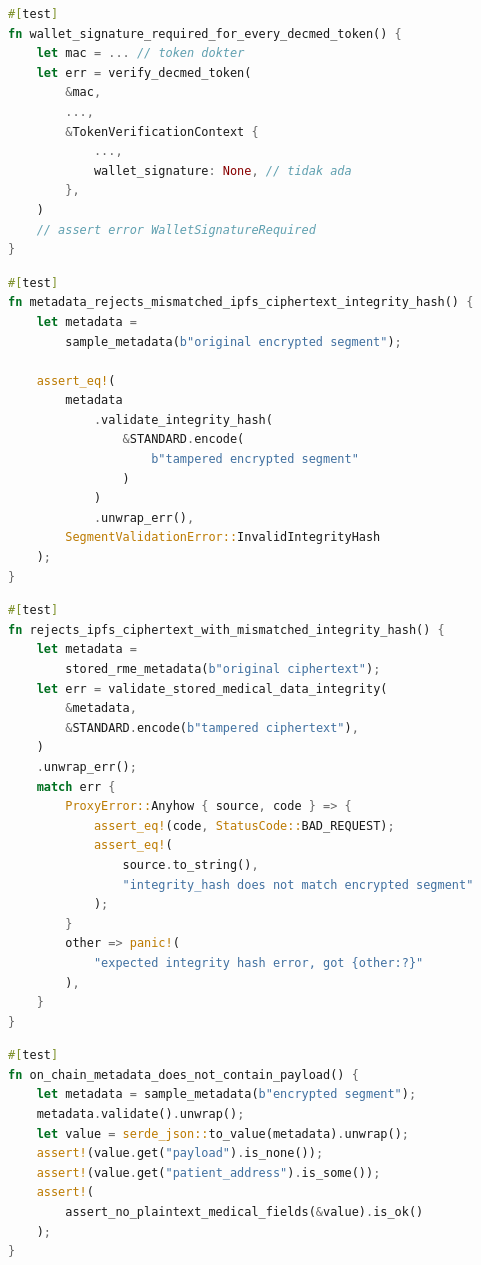 \begin{lstlisting}[language=Rust, caption=Pengujian P-KNF-13 untuk KNF-TA-06, label=lst:kode-pengujian-knf-ta-06-a]
#[test]
fn wallet_signature_required_for_every_decmed_token() {
    let mac = ... // token dokter 
    let err = verify_decmed_token(
        &mac,
        ...,
        &TokenVerificationContext {
			...,
            wallet_signature: None, // tidak ada
        },
    )
    // assert error WalletSignatureRequired
}
\end{lstlisting}

\begin{lstlisting}[language=Rust, caption=Pengujian P-KNF-14 untuk KNF-TA-07, label=lst:kode-pengujian-knf-ta-07-a]
#[test]
fn metadata_rejects_mismatched_ipfs_ciphertext_integrity_hash() {
    let metadata =
        sample_metadata(b"original encrypted segment");

    assert_eq!(
        metadata
            .validate_integrity_hash(
                &STANDARD.encode(
                    b"tampered encrypted segment"
                )
            )
            .unwrap_err(),
        SegmentValidationError::InvalidIntegrityHash
    );
}
\end{lstlisting}

\begin{lstlisting}[language=Rust, caption=Pengujian P-KNF-15 untuk KNF-TA-07, label=lst:kode-pengujian-knf-ta-07-b]
#[test]
fn rejects_ipfs_ciphertext_with_mismatched_integrity_hash() {
    let metadata =
        stored_rme_metadata(b"original ciphertext");
    let err = validate_stored_medical_data_integrity(
        &metadata,
        &STANDARD.encode(b"tampered ciphertext"),
    )
    .unwrap_err();
    match err {
        ProxyError::Anyhow { source, code } => {
            assert_eq!(code, StatusCode::BAD_REQUEST);
            assert_eq!(
                source.to_string(),
                "integrity_hash does not match encrypted segment"
            );
        }
        other => panic!(
            "expected integrity hash error, got {other:?}"
        ),
    }
}
\end{lstlisting}

\begin{lstlisting}[language=Rust, caption=Pengujian P-KNF-16 untuk KNF-TA-08, label=lst:kode-pengujian-knf-ta-08-a]
#[test]
fn on_chain_metadata_does_not_contain_payload() {
    let metadata = sample_metadata(b"encrypted segment");
    metadata.validate().unwrap();
    let value = serde_json::to_value(metadata).unwrap();
    assert!(value.get("payload").is_none());
    assert!(value.get("patient_address").is_some());
    assert!(
        assert_no_plaintext_medical_fields(&value).is_ok()
    );
}
\end{lstlisting}

